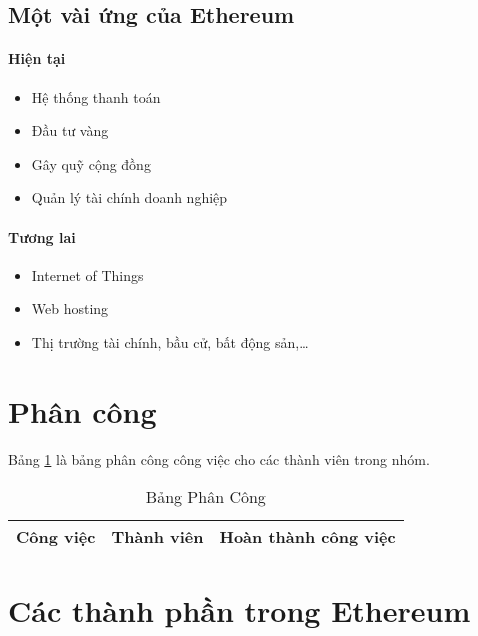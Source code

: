 \documentclass[12pt]{article}
\begin{document}
		\subsection{Một vài ứng của Ethereum}
		\paragraph{Hiện tại}
		\begin{itemize}
			\item Hệ thống thanh toán
			\item Đầu tư vàng
			\item Gây quỹ cộng đồng
			\item Quản lý tài chính doanh nghiệp
			
		\end{itemize}
		\paragraph{Tương lai}
		\begin{itemize}
			\item Internet of Things
			
			\item Web hosting
			
			\item Thị trường tài chính, bầu cử, bất động sản,…
			
			
		\end{itemize}
	\newpage
	\section{Phân công}
	Bảng \ref{table:one} là bảng phân công công việc cho các thành viên trong nhóm.
	\newline
	\begin{table}[ht]
		\centering
		
		\begin{tabular}{| p{6cm} | p{5cm} | p{5cm} |}
			\hline
			\textbf{Công việc}  & \textbf{Thành viên} & \textbf{Hoàn thành công việc}\\
			\hline
			
		\end{tabular}
		\label{table:one}
		\caption{Bảng Phân Công}
	\end{table}
	\newpage
	\section{Các thành phần trong Ethereum}
\end{document}
